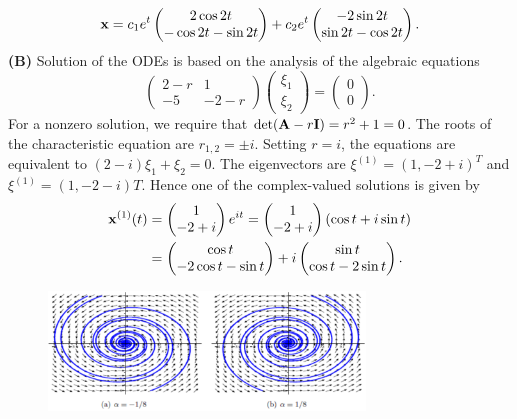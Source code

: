 \documentclass[11pt,a4paper]{article}
\begin{document}
\begin{enumerate}
		$$
		\vb{x} = c_1e^t
		\begin{pmatrix}
			2\cos 2t\\
			-\cos 2t - \sin 2t
		\end{pmatrix} + c_2e^t
		\begin{pmatrix}
			-2\sin 2t\\
			\sin 2t -\cos 2t
		\end{pmatrix}.
		$$
		\textbf{(B)} Solution of the ODEs is based on the analysis of the algebraic equations
		$$
		\begin{pmatrix}
			2-r & 1\\
			-5 & -2-r
		\end{pmatrix}
		\begin{pmatrix}
			\xi_1\\
			\xi_2
		\end{pmatrix} = 
		\begin{pmatrix}
			0\\
			0
		\end{pmatrix}.
		$$
		For a nonzero solution, we require that $\det(\vb{A} - r\vb{I}) = r^2 + 1 = 0$. The roots of the characteristic equation are $r_{1,2} = \pm i$. Setting $r = i$, the equations are equivalent to $(2 - i)\xi_1 + \xi_2 = 0$. The eigenvectors are $\xi^{(1)} = (1, -2 + i)^T$ and $\xi^{(1)} = (1, -2 - i)T$. Hence one of the complex-valued solutions is given by
		\begin{align*}
			\vb{x}^{(1)}(t) &=
			\begin{pmatrix}
				1\\
				-2+i
			\end{pmatrix}e^{it} =
			\begin{pmatrix}
				1\\
				-2+i
			\end{pmatrix}(\cos t + i\sin t)\\
			&=
			\begin{pmatrix}
				\cos t\\
				-2\cos t - \sin t
			\end{pmatrix} + i
			\begin{pmatrix}
				\sin t\\
				\cos t - 2\sin t
			\end{pmatrix}.
		\end{align*}
		\begin{figure}[H]
			\centering
			\includegraphics[width=0.75\textwidth]{figure/4_fig1.PNG}

\end{figure}
\end{enumerate}
\end{document}
